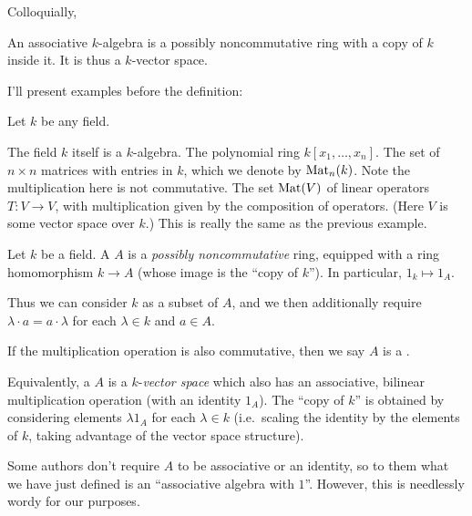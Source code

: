 Colloquially,
\begin{moral}
	An associative $k$-algebra is
	a possibly noncommutative ring with a copy of $k$ inside it.
	It is thus a $k$-vector space.
\end{moral}
I'll present examples before the definition:
\begin{example}
	Let $k$ be any field.
	\begin{enumerate}[(a)]
		\ii The field $k$ itself is a $k$-algebra.
		\ii The polynomial ring $k[x_1, \dots, x_n]$.
		\ii The set of $n \times n$ matrices with entries in $k$,
		which we denote by $\mathrm{Mat}_n(k)$.
		Note the multiplication here is not commutative.
		\ii The set $\mathrm{Mat}(V)$ of linear operators $T : V \to V$,
		with multiplication given by the composition of operators.
		(Here $V$ is some vector space over $k$.)
		This is really the same as the previous example.
	\end{enumerate}
\end{example}
\begin{definition}
	Let $k$ be a field.
	A  $A$ is a \emph{possibly noncommutative} ring,
	equipped with a ring homomorphism $k \to A$
	(whose image is the ``copy of $k$'').
	In particular, $1_k \mapsto 1_A$.

	Thus we can consider $k$ as a subset of $A$, and
	we then additionally require $\lambda \cdot a = a \cdot \lambda$
	for each $\lambda \in k$ and $a \in A$.

	If the multiplication operation is also commutative,
	then we say $A$ is a .
\end{definition}
\begin{definition}
	Equivalently, a  $A$ is a
	$k$-\emph{vector space} which also has an associative,
	bilinear multiplication operation (with an identity $1_A$).
	The ``copy of $k$'' is obtained by considering elements
	$\lambda 1_A$ for each $\lambda \in k$
	(i.e.\ scaling the identity by the elements of $k$,
	taking advantage of the vector space structure).
\end{definition}

\begin{abuse}
	Some authors don't require $A$ to be associative or
	an identity, so to them what we have just defined is an
	``associative algebra with $1$''.
	However, this is needlessly wordy for our purposes.
\end{abuse}

